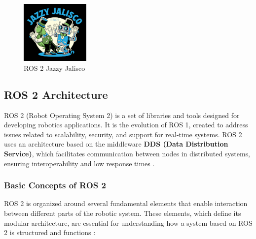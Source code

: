 \begin{figure}[H]
    \centering
    \includegraphics[width=0.3\textwidth]{pictures/jazzy_logo.png}
    \caption{ROS 2 Jazzy Jalisco}
    \label{fig:imagen2}
\end{figure}

\subsection{ROS 2 Architecture}

    ROS 2 (Robot Operating System 2) is a set of libraries and tools designed for developing robotics applications. It is the evolution of ROS 1, created to address issues related to scalability, security, and support for real-time systems. ROS 2 uses an architecture based on the middleware \textbf{DDS (Data Distribution Service)}, which facilitates communication between nodes in distributed systems, ensuring interoperability and low response times \cite{ros_docs}.  
    
    \subsubsection{Basic Concepts of ROS 2}
    
    ROS 2 is organized around several fundamental elements that enable interaction between different parts of the robotic system. These elements, which define its modular architecture, are essential for understanding how a system based on ROS 2 is structured and functions \cite{ros_docs}:  
    
